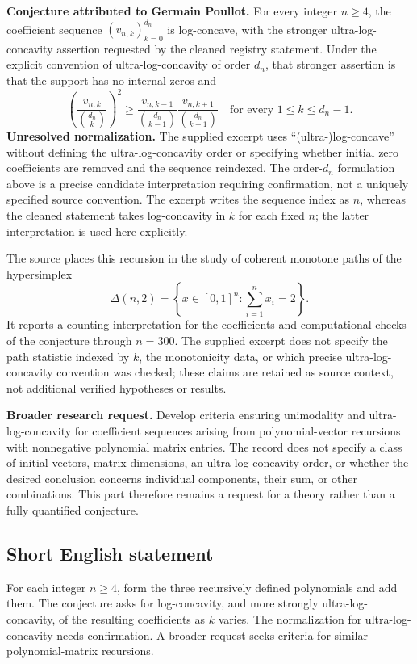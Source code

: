 \documentclass[11pt]{article}
\begin{document}
\textbf{Conjecture attributed to Germain Poullot.} For every integer \(n\geq4\), the coefficient sequence \((v_{n,k})_{k=0}^{d_n}\) is log-concave, with the stronger ultra-log-concavity assertion requested by the cleaned registry statement. Under the explicit convention of ultra-log-concavity of order \(d_n\), that stronger assertion is that the support has no internal zeros and
\[
\left(\frac{v_{n,k}}{\binom{d_n}{k}}\right)^2
\geq
\frac{v_{n,k-1}}{\binom{d_n}{k-1}}
\frac{v_{n,k+1}}{\binom{d_n}{k+1}}
\quad\text{for every }1\leq k\leq d_n-1.
\]
\textbf{Unresolved normalization.} The supplied excerpt uses ``(ultra-)log-concave'' without defining the ultra-log-concavity order or specifying whether initial zero coefficients are removed and the sequence reindexed. The order-\(d_n\) formulation above is a precise candidate interpretation requiring confirmation, not a uniquely specified source convention. The excerpt writes the sequence index as \(n\), whereas the cleaned statement takes log-concavity in \(k\) for each fixed \(n\); the latter interpretation is used here explicitly.

The source places this recursion in the study of coherent monotone paths of the hypersimplex
\[
\Delta(n,2)=\left\{x\in[0,1]^n:\sum_{i=1}^n x_i=2\right\}.
\]
It reports a counting interpretation for the coefficients and computational checks of the conjecture through \(n=300\). The supplied excerpt does not specify the path statistic indexed by \(k\), the monotonicity data, or which precise ultra-log-concavity convention was checked; these claims are retained as source context, not additional verified hypotheses or results.

\textbf{Broader research request.} Develop criteria ensuring unimodality and ultra-log-concavity for coefficient sequences arising from polynomial-vector recursions with nonnegative polynomial matrix entries. The record does not specify a class of initial vectors, matrix dimensions, an ultra-log-concavity order, or whether the desired conclusion concerns individual components, their sum, or other combinations. This part therefore remains a request for a theory rather than a fully quantified conjecture.
\subsection{Short English statement}
For each integer \(n\geq4\), form the three recursively defined polynomials and add them. The conjecture asks for log-concavity, and more strongly ultra-log-concavity, of the resulting coefficients as \(k\) varies. The normalization for ultra-log-concavity needs confirmation. A broader request seeks criteria for similar polynomial-matrix recursions.
\end{document}
